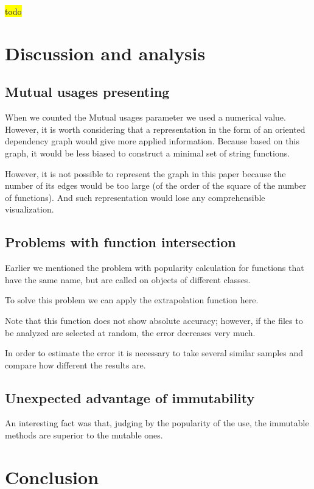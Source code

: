 \documentclass[anonymous,sigplan,review,11pt,nonacm,natbib=false]{acmart}
\begin{document}
    \hl{todo}

    \section{Discussion and analysis}

    \subsection{Mutual usages presenting}

    When we counted the Mutual usages parameter we used a numerical value. However, it is worth considering that a representation in the form of an oriented dependency graph would give more applied information. Because based on this graph, it would be less biased to construct a minimal set of string functions.

    However, it is not possible to represent the graph in this paper because the number of its edges would be too large (of the order of the square of the number of functions). And such representation would lose any comprehensible visualization.

    \subsection{Problems with function intersection}

    Earlier we mentioned the problem with popularity calculation for functions that have the same name, but are called on objects of different classes.

    To solve this problem we can apply the extrapolation function here.

    Note that this function does not show absolute accuracy; however, if the files to be analyzed are selected at random, the error decreases very much.

    In order to estimate the error it is necessary to take several similar samples and compare how different the results are.

    \subsection{Unexpected advantage of immutability}

    An interesting fact was that, judging by the popularity of the use, the immutable methods are superior to the mutable ones.

    \section{Conclusion}\label{sec:conclusion}
\end{document}
